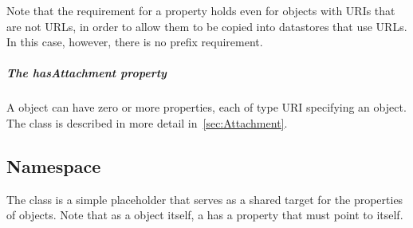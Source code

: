 Note that the requirement for a  property holds even for objects with URIs that are not URLs, in order to allow them to be copied into datastores that use URLs.  In this case, however, there is no prefix requirement.


\subparagraph{The hasAttachment property}
\label{sec:hasAttachment}
A  object can have zero or more  properties, each of type URI specifying an  object. The  class is described in more detail in~\ref{sec:Attachment}.


\subsection{Namespace}
\label{sec:Namespace}

The  class is a simple placeholder that serves as a shared target for the  properties of  objects.
Note that as a  object itself, a  has a  property that must point to itself.

